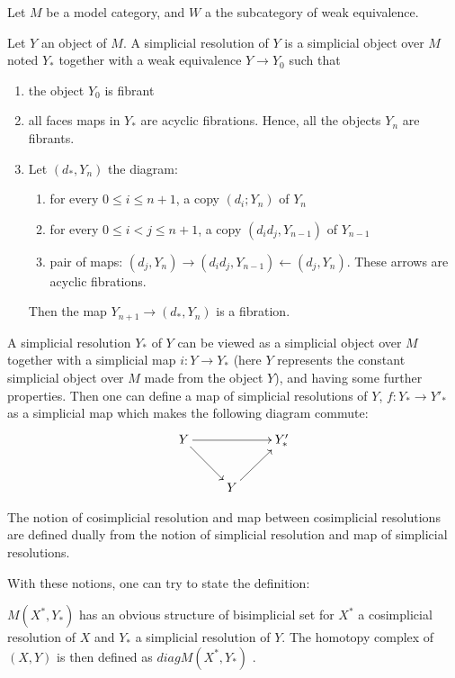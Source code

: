 Let $M$ be a model category, and $W$ a the subcategory of weak equivalence.

\begin{defin}
Let $Y$ an object of $M$. A simplicial resolution of $Y$ is a simplicial object over $M$ noted $Y_*$ together with a weak equivalence $Y \rightarrow Y_0$ such that
\begin{enumerate}
\item the object $Y_0$ is fibrant
\item all faces maps in $Y_*$ are acyclic fibrations. Hence, all the objects $Y_n$ are fibrants.
\item Let $(d_*, Y_n)$ the diagram:
\begin{enumerate}
\item for every $0 \le i \le n+1$, a copy $(d_i; Y_n)$ of $Y_n$
\item for every $0 \le i < j \le n+1$, a copy $(d_id_j,Y_{n-1})$ of $Y_{n-1}$
\item pair of maps: $(d_j, Y_n) \rightarrow (d_id_j,Y_{n-1}) \leftarrow (d_j, Y_n)$. These arrows are acyclic fibrations. 
\end{enumerate}
Then the map $Y_{n+1} \rightarrow (d_*,Y_n)$ is a fibration.
\end{enumerate}
\end{defin}

\begin{defin}
A simplicial resolution $Y_*$ of $Y$ can be viewed as a simplicial object over $M$ together with a simplicial map $i:Y \rightarrow Y_*$ (here $Y$ represents the constant simplicial object over $M$ made from the object $Y$), and having some further properties. Then one can define a map of simplicial resolutions of $Y$, $f:Y_* \rightarrow {Y'}_*$ as a simplicial map which makes the following diagram commute:
\[ \xymatrix{Y \ar[rr] \ar[dr] && {Y'_*} \\ & Y \ar[ur]} \]
\end{defin}


\begin{defin}
The notion of cosimplicial resolution and map between cosimplicial resolutions are defined dually from the notion of simplicial resolution and map of simplicial resolutions.
\end{defin}

With these notions, one can try to state the definition:

\begin{defin}
$M(X^*,Y_*)$ has an obvious structure of bisimplicial set for $X^*$ a cosimplicial resolution of $X$ and $Y_*$ a simplicial resolution of $Y$. The homotopy complex of $(X,Y)$ is then defined as $diag M(X^*,Y_*)$ .
\end{defin}

